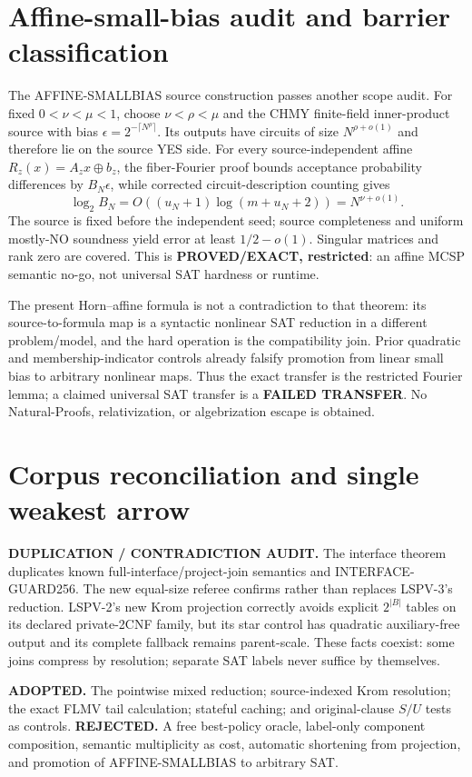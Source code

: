 \documentclass[11pt]{article}
\begin{document}
\section{Affine-small-bias audit and barrier classification}
The AFFINE-SMALLBIAS source construction passes another scope audit.  For fixed
$0<\nu<\mu<1$, choose $\nu<\rho<\mu$ and the CHMY finite-field
inner-product source with bias $\epsilon=2^{-\lceil N^\rho\rceil}$.  Its
outputs have circuits of size $N^{\rho+o(1)}$ and therefore lie on the source
YES side.  For every source-independent affine $R_z(x)=A_zx\oplus b_z$, the
fiber-Fourier proof bounds acceptance probability differences by
$B_N\epsilon$, while corrected circuit-description counting gives
\[
 \log_2 B_N=O((u_N+1)\log(m+u_N+2))=N^{\nu+o(1)}.
\]
The source is fixed before the independent seed; source completeness and uniform
mostly-NO soundness yield error at least $1/2-o(1)$.  Singular matrices and
rank zero are covered.  This is \textbf{PROVED/EXACT, restricted}: an affine
MCSP semantic no-go, not universal SAT hardness or runtime.

The present Horn--affine formula is not a contradiction to that theorem: its
source-to-formula map is a syntactic nonlinear SAT reduction in a different
problem/model, and the hard operation is the compatibility join.  Prior
quadratic and membership-indicator controls already falsify promotion from
linear small bias to arbitrary nonlinear maps.  Thus the exact transfer is the
restricted Fourier lemma; a claimed universal SAT transfer is a
\textbf{FAILED TRANSFER}.  No Natural-Proofs, relativization, or algebrization
escape is obtained.

\section{Corpus reconciliation and single weakest arrow}
\textbf{DUPLICATION / CONTRADICTION AUDIT.} The interface theorem duplicates
known full-interface/project-join semantics and INTERFACE-GUARD256.  The new
equal-size referee confirms rather than replaces LSPV-3's reduction.  LSPV-2's
new Krom projection correctly avoids explicit $2^{|B|}$ tables on its declared
private-2CNF family, but its star control has quadratic auxiliary-free output
and its complete fallback remains parent-scale.  These facts coexist: some
joins compress by resolution; separate SAT labels never suffice by themselves.

\textbf{ADOPTED.} The pointwise mixed reduction; source-indexed Krom resolution;
the exact FLMV tail calculation; stateful caching; and original-clause $S/U$
tests as controls.  \textbf{REJECTED.} A free best-policy oracle, label-only
component composition, semantic multiplicity as cost, automatic shortening
from projection, and promotion of AFFINE-SMALLBIAS to arbitrary SAT.
\end{document}
